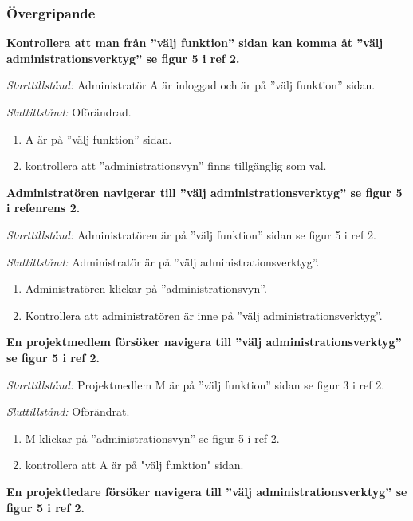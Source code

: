 \documentclass[a4paper]{article}
\begin{document}
\subsubsection{Övergripande}
\begin{FT}
\item %
\textbf{Kontrollera att man från ''välj funktion'' sidan kan komma åt ''välj administrationsverktyg'' se figur 5 i ref 2.}

\emph{Starttillstånd:}  Administratör A är inloggad och är på ''välj funktion'' sidan.

\emph{Sluttillstånd:} Oförändrad.

\begin{enumerate}
\item A är på ''välj funktion'' sidan.
\item kontrollera att ''administrationsvyn'' finns tillgänglig som val. 
\end{enumerate}

\item %
\textbf{Administratören navigerar till ''välj administrationsverktyg'' se figur 5 i refenrens 2.}

\emph{Starttillstånd:} Administratören är på ''välj funktion'' sidan se figur 5 i ref 2.

\emph{Sluttillstånd:} Administratör är på ''välj administrationsverktyg''.

\begin{enumerate}
\item Administratören klickar på ''administrationsvyn''.
\item Kontrollera att administratören är inne på ''välj administrationsverktyg''.
\end{enumerate}

\item %
\textbf{En projektmedlem försöker navigera till ''välj administrationsverktyg'' se figur 5 i ref 2.}

\emph{Starttillstånd:} Projektmedlem M är på ''välj funktion'' sidan se figur 3 i ref 2.

\emph{Sluttillstånd:} Oförändrat.

\begin{enumerate}
\item M klickar på ''administrationsvyn'' se figur 5 i ref 2.
\item kontrollera att A är på "välj funktion" sidan. 
\end{enumerate}

\item %
\textbf{En projektledare försöker navigera till ''välj administrationsverktyg'' se figur 5 i ref 2.}


\end{FT}
\end{document}
